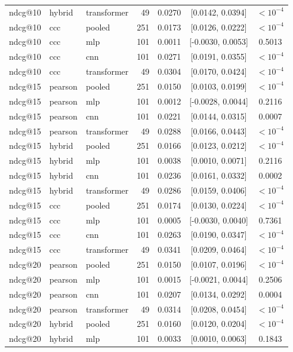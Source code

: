 \begin{longtable}{lllrrcc}
ndcg@10 & hybrid & transformer & 49 & 0.0270 & [0.0142, 0.0394] & $<10^{-4}$ \\
ndcg@10 & ccc & pooled & 251 & 0.0173 & [0.0126, 0.0222] & $<10^{-4}$ \\
ndcg@10 & ccc & mlp & 101 & 0.0011 & [-0.0030, 0.0053] & 0.5013 \\
ndcg@10 & ccc & cnn & 101 & 0.0271 & [0.0191, 0.0355] & $<10^{-4}$ \\
ndcg@10 & ccc & transformer & 49 & 0.0304 & [0.0170, 0.0424] & $<10^{-4}$ \\
ndcg@15 & pearson & pooled & 251 & 0.0150 & [0.0103, 0.0199] & $<10^{-4}$ \\
ndcg@15 & pearson & mlp & 101 & 0.0012 & [-0.0028, 0.0044] & 0.2116 \\
ndcg@15 & pearson & cnn & 101 & 0.0221 & [0.0144, 0.0315] & 0.0007 \\
ndcg@15 & pearson & transformer & 49 & 0.0288 & [0.0166, 0.0443] & $<10^{-4}$ \\
ndcg@15 & hybrid & pooled & 251 & 0.0166 & [0.0123, 0.0212] & $<10^{-4}$ \\
ndcg@15 & hybrid & mlp & 101 & 0.0038 & [0.0010, 0.0071] & 0.2116 \\
ndcg@15 & hybrid & cnn & 101 & 0.0236 & [0.0161, 0.0332] & 0.0002 \\
ndcg@15 & hybrid & transformer & 49 & 0.0286 & [0.0159, 0.0406] & $<10^{-4}$ \\
ndcg@15 & ccc & pooled & 251 & 0.0174 & [0.0130, 0.0224] & $<10^{-4}$ \\
ndcg@15 & ccc & mlp & 101 & 0.0005 & [-0.0030, 0.0040] & 0.7361 \\
ndcg@15 & ccc & cnn & 101 & 0.0263 & [0.0190, 0.0347] & $<10^{-4}$ \\
ndcg@15 & ccc & transformer & 49 & 0.0341 & [0.0209, 0.0464] & $<10^{-4}$ \\
ndcg@20 & pearson & pooled & 251 & 0.0150 & [0.0107, 0.0196] & $<10^{-4}$ \\
ndcg@20 & pearson & mlp & 101 & 0.0015 & [-0.0021, 0.0044] & 0.2506 \\
ndcg@20 & pearson & cnn & 101 & 0.0207 & [0.0134, 0.0292] & 0.0004 \\
ndcg@20 & pearson & transformer & 49 & 0.0314 & [0.0208, 0.0454] & $<10^{-4}$ \\
ndcg@20 & hybrid & pooled & 251 & 0.0160 & [0.0120, 0.0204] & $<10^{-4}$ \\
ndcg@20 & hybrid & mlp & 101 & 0.0033 & [0.0010, 0.0063] & 0.1843 \\

\end{longtable}
